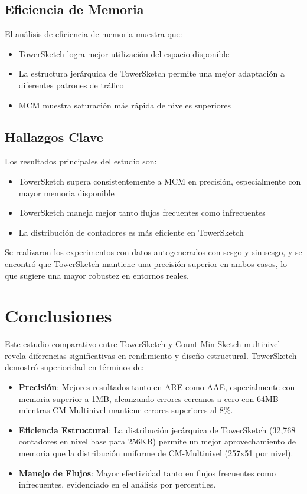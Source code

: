 \documentclass[a4paper,12pt]{article}
\begin{document}
\subsection{Eficiencia de Memoria}
El análisis de eficiencia de memoria muestra que:

\begin{itemize}
    \item TowerSketch logra mejor utilización del espacio disponible
    \item La estructura jerárquica de TowerSketch permite una mejor adaptación a diferentes patrones de tráfico
    \item MCM muestra saturación más rápida de niveles superiores
\end{itemize}

\subsection{Hallazgos Clave}
Los resultados principales del estudio son:

\begin{itemize}
    \item TowerSketch supera consistentemente a MCM en precisión, especialmente con mayor memoria disponible
    \item TowerSketch maneja mejor tanto flujos frecuentes como infrecuentes
    \item La distribución de contadores es más eficiente en TowerSketch
\end{itemize}

\noindent Se realizaron los experimentos con datos autogenerados con sesgo y sin sesgo, y se encontró que TowerSketch mantiene una precisión superior en ambos casos, lo que sugiere una mayor robustez en entornos reales.

\newpage
\section{Conclusiones}

Este estudio comparativo entre TowerSketch y Count-Min Sketch multinivel revela diferencias significativas en rendimiento y diseño estructural. TowerSketch demostró superioridad en términos de:

\begin{itemize}
    \item \textbf{Precisión}: Mejores resultados tanto en ARE como AAE, especialmente con memoria superior a 1MB, alcanzando errores cercanos a cero con 64MB mientras CM-Multinivel mantiene errores superiores al 8\%.
    
    \item \textbf{Eficiencia Estructural}: La distribución jerárquica de TowerSketch (32,768 contadores en nivel base para 256KB) permite un mejor aprovechamiento de memoria que la distribución uniforme de CM-Multinivel (257x51 por nivel).
    
    \item \textbf{Manejo de Flujos}: Mayor efectividad tanto en flujos frecuentes como infrecuentes, evidenciado en el análisis por percentiles.
\end{itemize}
\end{document}
